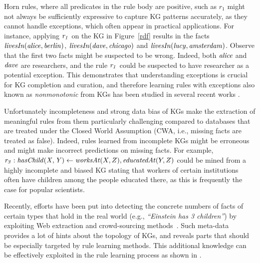 Horn rules, where all predicates in the rule body are positive, such as $r_1$ might not always be sufficiently expressive %
to capture KG patterns accurately, as they  cannot handle exceptions, which often appear in practical applications. 
For instance, applying $\mathit{r_1}$ on the KG in Figure~\ref{rdf} results in the facts $\mathit{livesIn(alice,berlin)}$, $\mathit{livesIn(dave,chicago)}$ and $\mathit{livesIn(lucy,amsterdam)}$. Observe that the first two facts might be suspected to be wrong. Indeed, both $\mathit{alice}$ and $\mathit{dave}$ are researchers, and the rule $\mathit{r_1}$ could be suspected to have researcher as a potential exception.
This demonstrates that understanding exceptions is crucial for KG completion and curation, and therefore learning rules with exceptions also known as \emph{nonmonotonic} from KGs has been studied in several recent works \cite{gad2016,rumis}.


Unfortunately incompleteness and strong data bias of KGs make the extraction of meaningful rules from them particularly challenging compared to databases that are treated under the Closed World Assumption (CWA, i.e., missing facts are treated as false). Indeed, rules learned from incomplete KGs might be erroneous and might make incorrect predictions on missing facts. 
For example, $\mathit{r_3}: \mathit{hasChild(X,Y)}\leftarrow \mathit{worksAt}(X,Z),\mathit{educatedAt}(Y,Z)$ could be mined from a highly incomplete and biased KG stating that workers of certain institutions often have children among the people educated there, 
as this is frequently the case for popular scientists.





Recently, efforts have been put into detecting the concrete numbers of 
facts of certain types that hold in the real world 
(e.g., \emph{``Einstein has 3 children''}) by exploiting Web extraction and crowd-sourcing methods~\cite{cardinality-extraction-iswc-2016,cool-wd}. Such 
meta-data provides a lot of hints about the topology of KGs, and reveals 
parts that should be especially targeted by rule learning methods.
This additional knowledge can be effectively exploited in the rule learning process as shown in \cite{carl}.



